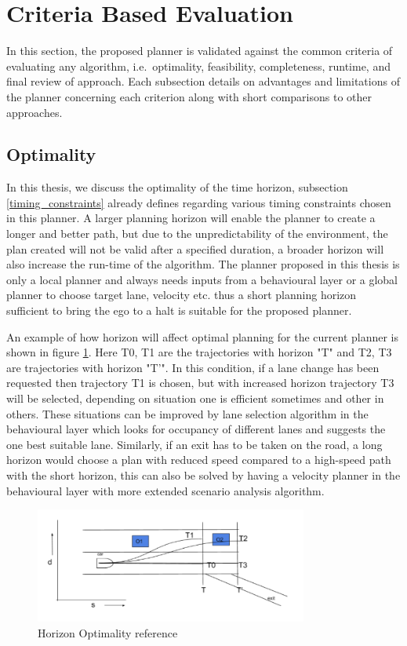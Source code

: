 \section{Criteria Based Evaluation}
\label{criteria_based_eval}
In this section, the proposed planner is validated against the common criteria of evaluating any algorithm, i.e.\ optimality, feasibility, completeness, runtime, and final review of approach. Each subsection details on advantages and limitations of the planner concerning each criterion along with short comparisons to other approaches. 

\subsection{Optimality}
 In this thesis, we discuss the optimality of the time horizon, subsection \ref{timing_constraints} already defines regarding various timing constraints chosen in this planner. A larger planning horizon will enable the planner to create a longer and better path, but due to the unpredictability of the environment, the plan created will not be valid after a specified duration, a broader horizon will also increase the run-time of the algorithm. The planner proposed in this thesis is only a local planner and always needs inputs from a behavioural layer or a global planner to choose target lane, velocity etc. thus a short planning horizon sufficient to bring the ego to a halt is suitable for the proposed planner. 

An example of how horizon will affect optimal planning for the current planner is shown in figure \ref{horizon_optimality}. Here T0, T1 are the trajectories with horizon "T" and T2, T3 are trajectories with horizon "T'". In this condition, if a lane change has been requested then trajectory T1 is chosen, but with increased horizon trajectory T3 will be selected, depending on situation one is efficient sometimes and other in others. These situations can be improved by lane selection algorithm in the behavioural layer which looks for occupancy of different lanes and suggests the one best suitable lane. Similarly, if an exit has to be taken on the road, a long horizon would choose a plan with reduced speed compared to a high-speed path with the short horizon, this can also be solved by having a velocity planner in the behavioural layer with more extended scenario analysis algorithm.  

\begin{figure}
    \centering
    \includegraphics[width=0.8\textwidth]{Images/horizaon_optimality_2.png}
    \caption{Horizon Optimality reference}
    \label{horizon_optimality}
\end{figure}
 
